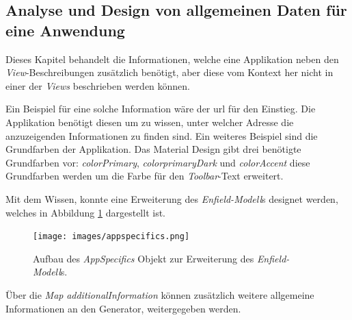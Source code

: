 \subsection{Analyse und Design von allgemeinen Daten für eine Anwendung}

Dieses Kapitel behandelt die Informationen, welche eine Applikation neben den \textit{View}-Beschreibungen zusätzlich benötigt, aber diese vom Kontext her nicht in einer der \textit{Views} beschrieben werden können.

Ein Beispiel für eine solche Information wäre der \acf{url} für den Einstieg. Die Applikation benötigt diesen um zu wissen, unter welcher Adresse die anzuzeigenden Informationen zu finden sind. Ein weiteres Beispiel sind die Grundfarben der Applikation. Das Material Design gibt drei benötigte Grundfarben vor: \textit{colorPrimary}, \textit{colorprimaryDark} und \textit{colorAccent} diese Grundfarben werden um die Farbe für den \textit{Toolbar}-Text erweitert.

Mit dem Wissen, konnte eine Erweiterung des \textit{Enfield-Modell}s designet werden, welches in Abbildung \ref{fig:appspecifics} dargestellt ist.

\begin{figure}[H]
	\begin{center}
		\texttt{[image: images/appspecifics.png]}
		\caption{Aufbau des \textit{AppSpecifics} Objekt  zur Erweiterung des \textit{Enfield-Modell}s.}
		\label{fig:appspecifics}
	\end{center}
\end{figure}

Über die \textit{Map} \textit{additionalInformation} können zusätzlich weitere allgemeine Informationen an den Generator, weitergegeben werden.
